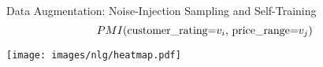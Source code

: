 \begin{frame}{Data Augmentation: Noise-Injection Sampling and Self-Training}
\[PMI( \textrm{customer\_rating=$v_i$, \textrm{price\_range=$v_j$}}) \]
\begin{center}
\texttt{[image: images/nlg/heatmap.pdf]}
\end{center}
\end{frame}





%
%
%
%
